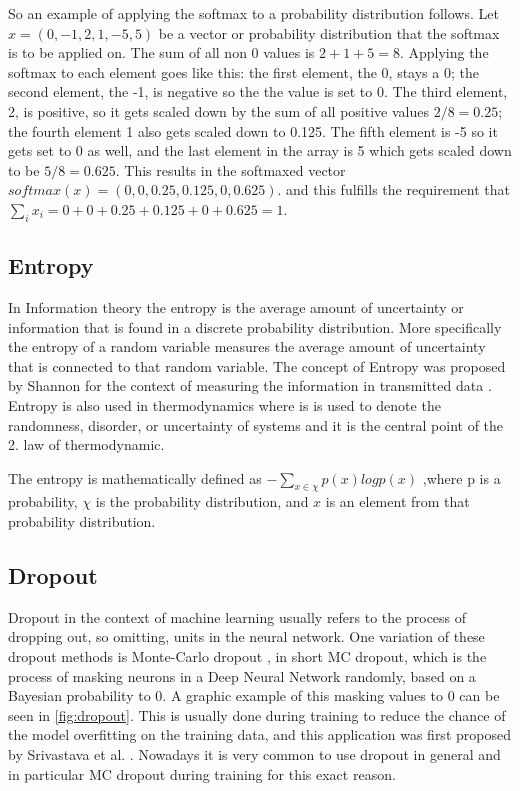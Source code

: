 So an example of applying the softmax to a probability distribution follows. Let $x= (0, -1, 2, 1, -5, 5)$ be a vector or probability distribution that the softmax is to be applied on. The sum of all non 0 values is $2+1+5=8$. Applying the softmax to each element goes like this: the first element, the 0, stays a 0; the second element, the -1, is negative so the the value is set to 0. The third element, 2, is positive, so it gets scaled down by the sum of all positive values $2/8=0.25$; the fourth element 1 also gets scaled down to 0.125. The fifth element is -5 so it gets set to 0 as well, and the last element in the array is 5 which gets scaled down to be $5/8=0.625$.
This results in the softmaxed vector $softmax(x)=(0,0,0.25,0.125,0,0.625)$. and this fulfills the requirement that $\sum_ix_i = 0+0+0.25+0.125+0+0.625= 1$. \cite[chapter~5.3.1]{jm3}

\subsection{Entropy}
\label{entropy}
In Information theory the entropy is the average amount of uncertainty or information that is found in a discrete probability distribution. More specifically the entropy of a random variable measures the average amount of uncertainty that is connected to that random variable.
The concept of Entropy was proposed by Shannon for the context of measuring the information in transmitted data \cite{shannonentropy}. Entropy is also used in thermodynamics where is is used to denote the randomness, disorder, or uncertainty of systems and it is the central point of the 2. law of thermodynamic.

The entropy is mathematically defined as $- \sum_{x\in \chi} p(x) log p(x)$ ,where p is a probability, $\chi$ is the probability distribution, and $x$ is an element from that probability distribution.


\subsection{Dropout}\label{bg:dropout}
Dropout in the context of machine learning usually refers to the process of dropping out, so omitting, units in the neural network. 
One variation of these dropout methods is Monte-Carlo dropout \cite{gal2016dropoutbayesianapproximationrepresenting}, in short MC dropout, which is the process of masking neurons in a Deep Neural Network randomly, based on a Bayesian probability to 0. A graphic example of this masking values to 0 can be seen in \autoref{fig:dropout}.
This is usually done during training to reduce the chance of the model overfitting on the training data, and this application was first proposed by Srivastava et al. \cite{JMLR:v15:srivastava14a}. 
Nowadays it is very common to use dropout in general and in particular MC dropout during training for this exact reason.

